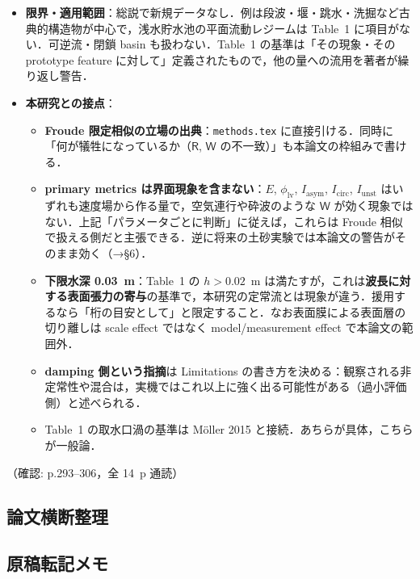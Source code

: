 \documentclass[11pt]{jsarticle}
\begin{document}
\begin{itemize}
\begin{itemize}
    \item 移動床と distensible structure はスケール効果なしの模型化がとくに難しい，が主要結論の一つ．粒径をそのまま $\lambda$ で縮小すると $d_g < 0.22$~mm で付着力が効き，$d_{50} > 0.5$~mm が要るなどの制約．
  \end{itemize}
  \item \textbf{限界・適用範囲}：総説で新規データなし．例は段波・堰・跳水・洗掘など古典的構造物が中心で，浅水貯水池の平面流動レジームは Table~1 に項目がない．可逆流・閉鎖 basin も扱わない．Table~1 の基準は「その現象・その prototype feature に対して」定義されたもので，他の量への流用を著者が繰り返し警告．
  \item \textbf{本研究との接点}：
  \begin{itemize}
    \item \textbf{Froude 限定相似の立場の出典}：\texttt{methods.tex} に直接引ける．同時に「何が犠牲になっているか（$\mathsf{R}$, $\mathsf{W}$ の不一致）」も本論文の枠組みで書ける．
    \item \textbf{primary metrics は界面現象を含まない}：$E$, $\phi_\mathrm{lv}$, $I_\mathrm{asym}$, $I_\mathrm{circ}$, $I_\mathrm{unst}$ はいずれも速度場から作る量で，空気連行や砕波のような $\mathsf{W}$ が効く現象ではない．上記「パラメータごとに判断」に従えば，これらは Froude 相似で扱える側だと主張できる．逆に将来の土砂実験では本論文の警告がそのまま効く（→§6）．
    \item \textbf{下限水深 0.03~m}：Table~1 の $h > 0.02$~m は満たすが，これは\textbf{波長に対する表面張力の寄与}の基準で，本研究の定常流とは現象が違う．援用するなら「桁の目安として」と限定すること．なお表面膜による表面層の切り離しは scale effect ではなく model/measurement effect で本論文の範囲外．
    \item \textbf{damping 側という指摘}は Limitations の書き方を決める：観察される非定常性や混合は，実機ではこれ以上に強く出る可能性がある（過小評価側）と述べられる．
    \item Table~1 の取水口渦の基準は M\"oller 2015 と接続．あちらが具体，こちらが一般論．
  \end{itemize}
\end{itemize}
\noindent（確認: p.293--306，全 14~p 通読）

\subsection*{論文横断整理}

\subsection*{原稿転記メモ}
\end{document}
